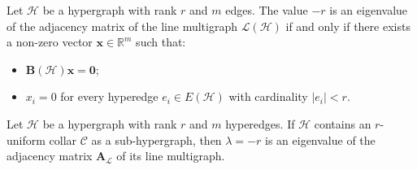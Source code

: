 \documentclass[10pt,a4paper]{amsart}
\begin{document}
\begin{lemma}\label{lem:lk}
Let $\mathcal{H}$ be a hypergraph with rank $r$ and $m$ edges. The value $-r$ is an eigenvalue of the adjacency matrix of the line multigraph $\mathcal{L}(\mathcal{H})$ if and only if there exists a non-zero vector $\mathbf{x} \in \mathbb{R}^{m}$ such that:
\begin{itemize}
\item $\mathbf{B}(\mathcal{H})\mathbf{x} = \mathbf{0}$;

\item $x_i = 0$ for every hyperedge $e_i \in E(\mathcal{H})$ with cardinality $|e_i| < r$.
\end{itemize}
\end{lemma}

\begin{theorem}\label{teo:collar_eigenvalue}
Let $\mathcal{H}$ be a hypergraph with rank $r$ and $m$ hyperedges. If $\mathcal{H}$ contains an $r$-uniform collar $\mathcal{C}$ as a sub-hypergraph, then $\lambda = -r$ is an eigenvalue of the adjacency matrix $\mathbf{A}_{\mathcal{L}}$ of its line multigraph.
\end{theorem}
\end{document}
